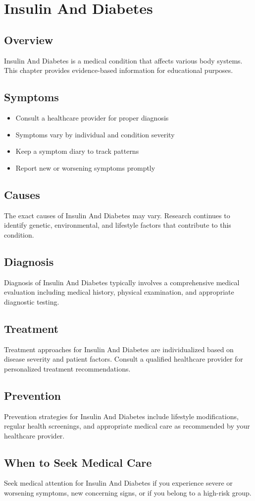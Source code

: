 \chapter{Insulin And Diabetes}

\section*{Overview}
Insulin And Diabetes is a medical condition that affects various body systems. This chapter provides evidence-based information for educational purposes.

\section*{Symptoms}
\begin{itemize}
  \item Consult a healthcare provider for proper diagnosis
  \item Symptoms vary by individual and condition severity
  \item Keep a symptom diary to track patterns
  \item Report new or worsening symptoms promptly
\end{itemize}

\section*{Causes}
The exact causes of Insulin And Diabetes may vary. Research continues to identify genetic, environmental, and lifestyle factors that contribute to this condition.

\section*{Diagnosis}
Diagnosis of Insulin And Diabetes typically involves a comprehensive medical evaluation including medical history, physical examination, and appropriate diagnostic testing.

\section*{Treatment}
Treatment approaches for Insulin And Diabetes are individualized based on disease severity and patient factors. Consult a qualified healthcare provider for personalized treatment recommendations.

\section*{Prevention}
Prevention strategies for Insulin And Diabetes include lifestyle modifications, regular health screenings, and appropriate medical care as recommended by your healthcare provider.

\section*{When to Seek Medical Care}
Seek medical attention for Insulin And Diabetes if you experience severe or worsening symptoms, new concerning signs, or if you belong to a high-risk group.
\clearpage

